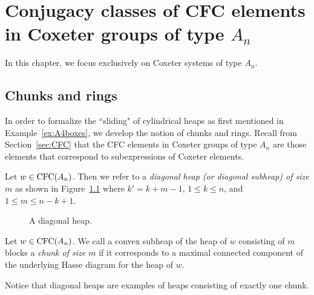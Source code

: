 \chapter{Conjugacy classes of CFC elements in Coxeter groups of type $A_n$}

    In this chapter, we focus exclusively on Coxeter systems of type $A_n$.

\section{Chunks and rings}\label{sec:chunks}
    In order to formalize the ``sliding" of cylindrical heaps as first mentioned in Example~\ref{ex:A4boxes}, we develop the notion of chunks and rings.    
    Recall from Section~\ref{sec:CFC} that the CFC elements in Coxeter groups of type $A_n$ are those elements that correspond to subexpressions of Coxeter elements.
    
\begin{definition} Let $w \in \operatorname{\mathrm{CFC}}(A_n)$. Then we refer to a \emph{diagonal heap (or diagonal subheap) of size $m$} as shown in Figure~\ref{fig:diagonalheap} where $k'=k+m-1$, $1 \leq k \leq n$, and $1 \leq m \leq n-k+1$.
\begin{center} \begin{figure}[H] \centering
{} \caption{A diagonal heap.}\label{fig:diagonalheap}
\end{figure} \end{center}
\end{definition}

\begin{definition} Let $w \in \operatorname{\mathrm{CFC}}(A_n)$. We call a convex subheap of the heap of $w$ consisting of $m$ blocks a \emph{chunk of size $m$} if it corresponds to a maximal connected component of the underlying Hasse diagram for the heap of $w$.
\end{definition}

    Notice that diagonal heaps are examples of heaps consisting of exactly one chunk.
    
